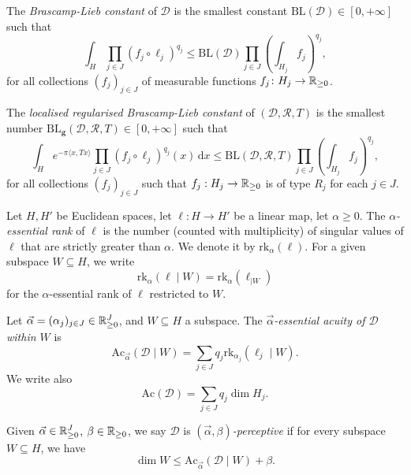 The \emph{Brascamp-Lieb constant} of $\mathcal{D}$ is the smallest constant $\mathrm{BL}(\mathcal{D})\in [0, +\infty]$ such that
\begin{equation*}%
\int_{H} \prod_{j \in J} (f_{j}\circ \ell_{j})^{q_{j}} \leq \mathrm{BL}(\mathcal{D}) \prod_{j \in J} \left(\int_{H_{j}} f_{j} \right)^{q_{j}},
\end{equation*}
for all collections $(f_{j})_{j \in J}$ of measurable functions $f_j  \colon H_{j} \rightarrow \mathbb{R}_{\geq 0}$.

The \emph{localised regularised Brascamp-Lieb constant} of $(\mathcal{D}, \mathcal{R}, T)$ is the smallest number $\mathrm{BL}_{\mathbf{g}}(\mathcal{D}, \mathcal{R}, T)\in [0,+\infty]$ such that
\[
\int_{H} e^{-\pi \langle x, T x \rangle} \prod_{j \in J} (f_{j}\circ \ell_{j})^{q_{j}}(x) \,\mathrm{d} x \leq \mathrm{BL}(\mathcal{D}, \mathcal{R}, T) \prod_{j \in J} \left(\int_{H_{j}} f_{j} \right)^{q_{j}},
\]
for all collections $(f_{j})_{j \in J}$ such that $f_j :  H_{j}\rightarrow \mathbb{R}_{\geq 0}$ is of type $R_j$ for each $j \in J$.


\begin{definition}\label{def-ess-rank}
Let $H,H'$ be Euclidean spaces, let $\ell:H\rightarrow H'$ be a linear map, let $\alpha \geq 0$.
The  \emph{$\alpha$-essential rank} of $\ell$ is the number (counted with multiplicity) of  singular values of $\ell$ that are strictly greater than $\alpha$. We denote it by $\mathrm{rk}_\alpha(\ell)$.
For a given subspace $W \subseteq H$, we write
\[
\mathrm{rk}_\alpha(\ell \mid W) = \mathrm{rk}_\alpha( \ell_{\mid W})
\]
for the $\alpha$-essential rank of $\ell$ restricted to $W$.
\end{definition}

\begin{definition} \label{def-acuity}
Let $\vec{\alpha}=(\alpha_{j})_{j\in J} \in \mathbb{R}_{\geq 0}^J$, and $W\subseteq H$ a subspace. The \emph{$\vec{\alpha}$-essential acuity of $\mathcal{D}$ within $W$} is
$$\mathrm{Ac}_{\vec{\alpha}}(\mathcal{D} \mid W) = \sum_{j\in J} q_{j} \mathrm{rk}_{\alpha_{j}}(\ell_{j} \mid W).$$
We write also
$$\mathrm{Ac}(\mathcal{D})=\sum_{j\in J}q_{j}\dim H_{j}.$$
\end{definition}

\begin{definition}
Given $\vec{\alpha}\in \mathbb{R}_{\geq0}^J$, $\beta\in \mathbb{R}_{\geq0}$, we say $\mathcal{D}$ is \emph{$(\vec{\alpha}, \beta)$-perceptive}  if for every subspace $W\subseteq H$, we have
\begin{equation}\label{def-alpha-beta-percep}
\dim W \leq \mathrm{Ac}_{\vec{\alpha}}(\mathcal{D} \mid W) + \beta.
\end{equation}
\end{definition}

